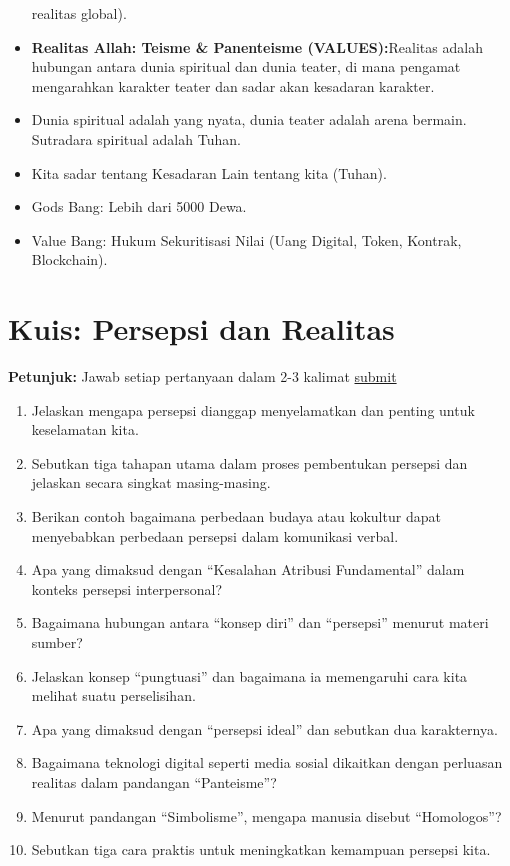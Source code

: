 \documentclass[
  letterpaper,
  DIV=11,
  numbers=noendperiod]{scrreprt}
\providecommand{\tightlist}{%
  \setlength{\itemsep}{0pt}\setlength{\parskip}{0pt}}
\begin{document}
\begin{itemize}
  realitas global).
\item
  \textbf{Realitas Allah: Teisme \& Panenteisme (VALUES):}Realitas
  adalah hubungan antara dunia spiritual dan dunia teater, di mana
  pengamat mengarahkan karakter teater dan sadar akan kesadaran
  karakter.
\item
  Dunia spiritual adalah yang nyata, dunia teater adalah arena bermain.
  Sutradara spiritual adalah Tuhan.
\item
  Kita sadar tentang Kesadaran Lain tentang kita (Tuhan).
\item
  Gods Bang: Lebih dari 5000 Dewa.
\item
  Value Bang: Hukum Sekuritisasi Nilai (Uang Digital, Token, Kontrak,
  Blockchain).
\end{itemize}

\section{Kuis: Persepsi dan Realitas}\label{kuis-persepsi-dan-realitas}

\textbf{Petunjuk:} Jawab setiap pertanyaan dalam 2-3 kalimat
\href{https://forms.office.com/r/HPKrDLU2DN}{submit}

\begin{enumerate}
\def\labelenumi{\arabic{enumi}.}
\tightlist
\item
  Jelaskan mengapa persepsi dianggap menyelamatkan dan penting untuk
  keselamatan kita.
\item
  Sebutkan tiga tahapan utama dalam proses pembentukan persepsi dan
  jelaskan secara singkat masing-masing.
\item
  Berikan contoh bagaimana perbedaan budaya atau kokultur dapat
  menyebabkan perbedaan persepsi dalam komunikasi verbal.
\item
  Apa yang dimaksud dengan ``Kesalahan Atribusi Fundamental'' dalam
  konteks persepsi interpersonal?
\item
  Bagaimana hubungan antara ``konsep diri'' dan ``persepsi'' menurut
  materi sumber?
\item
  Jelaskan konsep ``pungtuasi'' dan bagaimana ia memengaruhi cara kita
  melihat suatu perselisihan.
\item
  Apa yang dimaksud dengan ``persepsi ideal'' dan sebutkan dua
  karakternya.
\item
  Bagaimana teknologi digital seperti media sosial dikaitkan dengan
  perluasan realitas dalam pandangan ``Panteisme''?
\item
  Menurut pandangan ``Simbolisme'', mengapa manusia disebut
  ``Homologos''?
\item
  Sebutkan tiga cara praktis untuk meningkatkan kemampuan persepsi kita.
\end{enumerate}
\end{document}

